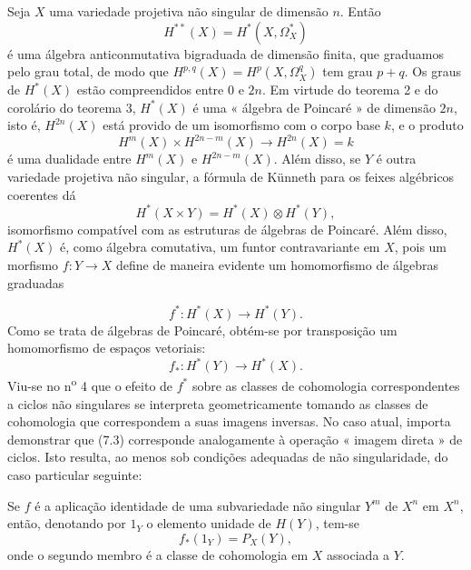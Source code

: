 
Seja $X$ uma variedade projetiva não singular de dimensão $n$. Então
\[
  H^{**}(X)=H^{*}(X,\Omega_X^{*})
\]
é uma álgebra anticonmutativa bigraduada de dimensão finita, que graduamos
pelo grau total, de modo que $H^{p,q}(X)=H^{p}(X,\Omega_X^{q})$ tem grau
$p+q$. Os graus de $H^{*}(X)$ estão compreendidos entre $0$ e $2n$. Em virtude do
teorema 2 e do corolário do teorema 3, $H^{*}(X)$ é uma « álgebra de
Poincaré » de dimensão $2n$, isto é, $H^{2n}(X)$ está provido de um isomorfismo com
o corpo base $k$, e o produto
\[
  H^{m}(X)\times H^{2n-m}(X)\longrightarrow H^{2n}(X)=k
\]
é uma dualidade entre $H^{m}(X)$ e $H^{2n-m}(X)$. Além disso, se $Y$ é outra
variedade projetiva não singular, a fórmula de Künneth para os
feixes algébricos coerentes dá
\begin{equation}\tag{7.1}
  H^{*}(X\times Y)=H^{*}(X)\otimes H^{*}(Y),
\end{equation}
isomorfismo compatível com as estruturas de álgebras de Poincaré. Além disso,
$H^{*}(X)$ é, como álgebra comutativa, um funtor contravariante em
$X$, pois um morfismo $f:Y\longrightarrow X$ define de maneira evidente um
homomorfismo de álgebras graduadas

\begin{equation}\tag{7.2}
  f^{*}:H^{*}(X)\longrightarrow H^{*}(Y).
\end{equation}
Como se trata de álgebras de Poincaré, obtém-se por transposição um
homomorfismo de espaços vetoriais:
\begin{equation}\tag{7.3}
  f_{*}:H^{*}(Y)\longrightarrow H^{*}(X).
\end{equation}
Viu-se no n\textsuperscript{o} 4 que o efeito de $f^{*}$ sobre as classes de
cohomologia correspondentes a ciclos não singulares se interpreta
geometricamente tomando as classes de cohomologia que correspondem a suas
imagens inversas. No caso atual, importa demonstrar que (7.3) corresponde
analogamente à operação « imagem direta » de ciclos. Isto resulta, ao menos sob
condições adequadas de não singularidade, do caso particular seguinte:

 Se $f$ é a aplicação identidade de uma subvariedade não
singular $Y^{m}$ de $X^{n}$ em $X^{n}$, então, denotando por $1_Y$
o elemento unidade de $H(Y)$, tem-se
\begin{equation}\tag{7.4}
  f_{*}(1_Y)=P_X(Y),
\end{equation}
onde o segundo membro é a classe de cohomologia em $X$ associada a $Y$.

